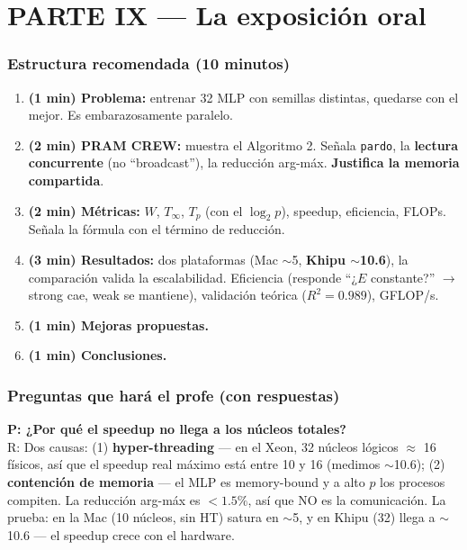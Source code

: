 \documentclass[11pt,a4paper]{article}
\begin{document}
\part*{PARTE IX --- La exposición oral}

\section{Estructura recomendada (10 minutos)}

\begin{enumerate}
  \item \textbf{(1 min) Problema:} entrenar 32 MLP con semillas distintas,
        quedarse con el mejor. Es embarazosamente paralelo.
  \item \textbf{(2 min) PRAM CREW:} muestra el Algoritmo 2. Señala \texttt{pardo},
        la \textbf{lectura concurrente} (no ``broadcast''), la reducción arg-máx.
        \textbf{Justifica la memoria compartida}.
  \item \textbf{(2 min) Métricas:} $W$, $T_\infty$, $T_p$ (con el $\log_2 p$),
        speedup, eficiencia, FLOPs. Señala la fórmula con el término de
        reducción.
  \item \textbf{(3 min) Resultados:} dos plataformas (Mac $\sim$5, \textbf{Khipu
        $\sim$10.6}), la comparación valida la escalabilidad. Eficiencia
        (responde ``¿$E$ constante?'' $\to$ strong cae, weak se mantiene),
        validación teórica ($R^2=0.989$), GFLOP/s.
  \item \textbf{(1 min) Mejoras propuestas.}
  \item \textbf{(1 min) Conclusiones.}
\end{enumerate}

\section{Preguntas que hará el profe (con respuestas)}

\textbf{P: ¿Por qué el speedup no llega a los núcleos totales?}\\
R: Dos causas: (1) \textbf{hyper-threading} --- en el Xeon, 32 núcleos lógicos
$\approx$ 16 físicos, así que el speedup real máximo está entre 10 y 16 (medimos
$\sim$10.6); (2) \textbf{contención de memoria} --- el MLP es memory-bound y a
alto $p$ los procesos compiten. La reducción arg-máx es $<1.5\%$, así que NO es
la comunicación. La prueba: en la Mac (10 núcleos, sin HT) satura en $\sim$5, y
en Khipu (32) llega a $\sim$10.6 --- el speedup crece con el hardware.
\end{document}
